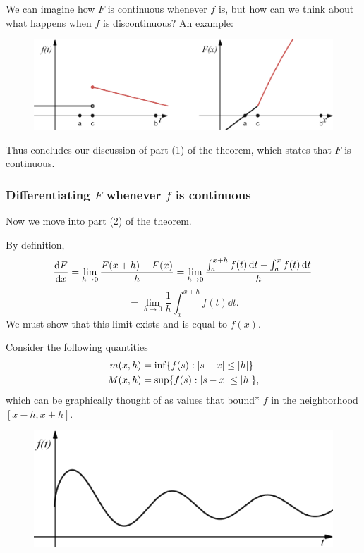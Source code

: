 \documentclass[mathserif]{beamer}
\newcommand{\sbr}[1]{\left[#1\right]}
\begin{document}
\begin{frame}

  We can imagine how $F$ is continuous whenever $f$ is, but how can we think about what happens when $f$ is discontinuous? An example:

  \begin{figure}[h]
    \centering
    \includegraphics[scale=0.33]{discontinuous}
  \end{figure}

  Thus concludes our discussion of part (1) of the theorem, which states that $F$ is continuous.

\end{frame}

\begin{frame}
  \frametitle{Differentiating $F$ whenever $f$ is continuous}
  Now we move into part (2) of the theorem.

  By definition, $$\dv{F}{x} = \lim_{h\to 0}\frac{F(x+h)-F(x)}{h} = \lim_{h\to 0}\frac{\int_a^{x+h}f(t)\dd{t} - \int_a^x f(t)\dd{t}}{h}$$
  $$= \lim_{h\to 0} \frac{1}{h}\int_x^{x+h} f(t)\dd{t}.$$ We must show that this limit exists and is equal to $f(x)$.
\end{frame}

\begin{frame}
  Consider the following quantities \begin{align} m(x,h) &= \inf\{f(s) : \abs{s-x}\leq \abs{h}\} \\ M(x,h) &= \sup\{f(s) : \abs{s-x}\leq \abs{h}\}, \end{align} which can be graphically thought of as values that bound* $f$ in the neighborhood $\sbr{x-h,x+h}$.

  \begin{figure}[h]
    \centering
    \includegraphics[scale=0.33]{neighborhood}
  \end{figure}
\end{frame}
\end{document}

